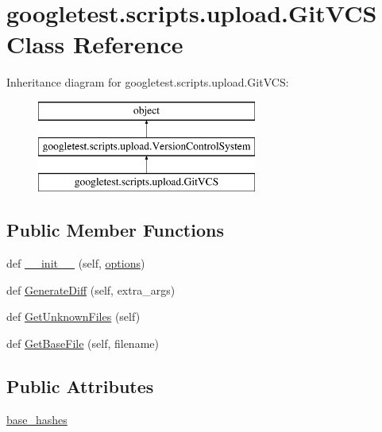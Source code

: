 \hypertarget{classgoogletest_1_1scripts_1_1upload_1_1_git_v_c_s}{}\section{googletest.\+scripts.\+upload.\+Git\+V\+CS Class Reference}
\label{classgoogletest_1_1scripts_1_1upload_1_1_git_v_c_s}
Inheritance diagram for googletest.\+scripts.\+upload.\+Git\+V\+CS\+:\begin{figure}[H]
\begin{center}
\leavevmode
\includegraphics[height=3.000000cm]{d0/d8b/classgoogletest_1_1scripts_1_1upload_1_1_git_v_c_s}
\end{center}
\end{figure}
\subsection*{Public Member Functions}
\begin{DoxyCompactItemize}
\item 
def \mbox{\hyperlink{classgoogletest_1_1scripts_1_1upload_1_1_git_v_c_s_a855833d850b297b23bee62796275adb7}{\+\_\+\+\_\+init\+\_\+\+\_\+}} (self, \mbox{\hyperlink{classgoogletest_1_1scripts_1_1upload_1_1_version_control_system_abd30c66b6c5c39c14df9a1fa4ffac67b}{options}})
\item 
def \mbox{\hyperlink{classgoogletest_1_1scripts_1_1upload_1_1_git_v_c_s_a0f17ec6f907aa737ac9b7c5d06f85884}{Generate\+Diff}} (self, extra\+\_\+args)
\item 
def \mbox{\hyperlink{classgoogletest_1_1scripts_1_1upload_1_1_git_v_c_s_adbbe5f9ce57c362cc9e79e270c39ab54}{Get\+Unknown\+Files}} (self)
\item 
def \mbox{\hyperlink{classgoogletest_1_1scripts_1_1upload_1_1_git_v_c_s_ac9fcd4827b37346353ea602106399f07}{Get\+Base\+File}} (self, filename)
\end{DoxyCompactItemize}
\subsection*{Public Attributes}
\begin{DoxyCompactItemize}
\item 
\mbox{\hyperlink{classgoogletest_1_1scripts_1_1upload_1_1_git_v_c_s_ab528f834b67a32ccb55b2ada00a166fa}{base\+\_\+hashes}}
\end{DoxyCompactItemize}


